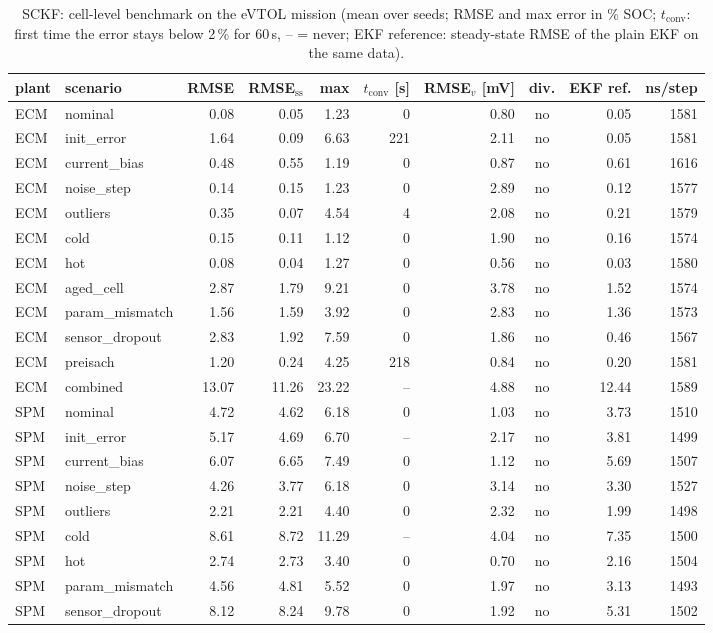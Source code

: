 \begin{table}[H]\centering\footnotesize\setlength{\tabcolsep}{4pt}
\caption{SCKF: cell-level benchmark on the eVTOL mission (mean over seeds; RMSE and max error in \% SOC; $t_\mathrm{conv}$: first time the error stays below 2\,\% for 60\,s, -- = never; EKF reference: steady-state RMSE of the plain EKF on the same data).}\label{tab:cell_SCKF}
\begin{tabular}{llrrrrrcrr}\toprule
plant & scenario & RMSE & RMSE$_\mathrm{ss}$ & max & $t_\mathrm{conv}$ [s] & RMSE$_v$ [mV] & div. & EKF ref. & ns/step \\ \midrule
ECM & nominal & 0.08 & 0.05 & 1.23 & 0 & 0.80 & no & 0.05 & 1581 \\
ECM & init\_error & 1.64 & 0.09 & 6.63 & 221 & 2.11 & no & 0.05 & 1581 \\
ECM & current\_bias & 0.48 & 0.55 & 1.19 & 0 & 0.87 & no & 0.61 & 1616 \\
ECM & noise\_step & 0.14 & 0.15 & 1.23 & 0 & 2.89 & no & 0.12 & 1577 \\
ECM & outliers & 0.35 & 0.07 & 4.54 & 4 & 2.08 & no & 0.21 & 1579 \\
ECM & cold & 0.15 & 0.11 & 1.12 & 0 & 1.90 & no & 0.16 & 1574 \\
ECM & hot & 0.08 & 0.04 & 1.27 & 0 & 0.56 & no & 0.03 & 1580 \\
ECM & aged\_cell & 2.87 & 1.79 & 9.21 & 0 & 3.78 & no & 1.52 & 1574 \\
ECM & param\_mismatch & 1.56 & 1.59 & 3.92 & 0 & 2.83 & no & 1.36 & 1573 \\
ECM & sensor\_dropout & 2.83 & 1.92 & 7.59 & 0 & 1.86 & no & 0.46 & 1567 \\
ECM & preisach & 1.20 & 0.24 & 4.25 & 218 & 0.84 & no & 0.20 & 1581 \\
ECM & combined & 13.07 & 11.26 & 23.22 & -- & 4.88 & no & 12.44 & 1589 \\
\midrule
SPM & nominal & 4.72 & 4.62 & 6.18 & 0 & 1.03 & no & 3.73 & 1510 \\
SPM & init\_error & 5.17 & 4.69 & 6.70 & -- & 2.17 & no & 3.81 & 1499 \\
SPM & current\_bias & 6.07 & 6.65 & 7.49 & 0 & 1.12 & no & 5.69 & 1507 \\
SPM & noise\_step & 4.26 & 3.77 & 6.18 & 0 & 3.14 & no & 3.30 & 1527 \\
SPM & outliers & 2.21 & 2.21 & 4.40 & 0 & 2.32 & no & 1.99 & 1498 \\
SPM & cold & 8.61 & 8.72 & 11.29 & -- & 4.04 & no & 7.35 & 1500 \\
SPM & hot & 2.74 & 2.73 & 3.40 & 0 & 0.70 & no & 2.16 & 1504 \\
SPM & param\_mismatch & 4.56 & 4.81 & 5.52 & 0 & 1.97 & no & 3.13 & 1493 \\
SPM & sensor\_dropout & 8.12 & 8.24 & 9.78 & 0 & 1.92 & no & 5.31 & 1502 \\
\bottomrule\end{tabular}\end{table}
